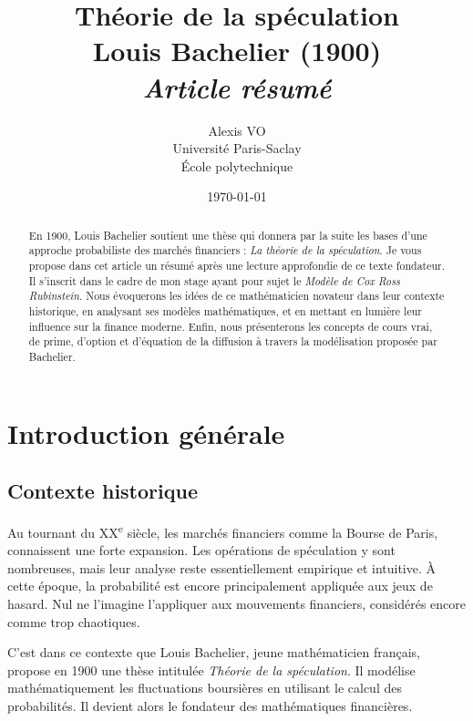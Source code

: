 \documentclass[12pt,a4paper]{article}
\title{\Huge{\textbf{Théorie de la spéculation\\ Louis Bachelier (1900)}}\\ \medskip
      \Huge{\textit{Article résumé}}\vspace*{0.7cm}}
\author{\LARGE{Alexis VO}\vspace{1cm}\\ \medskip
      Université Paris-Saclay\\École polytechnique}
\date{\vspace{0.2cm}\today}
\begin{document}
\vspace{\fill}
  \maketitle
\vspace{\fill}

\newpage

\tableofcontents

\begin{abstract}
En 1900, Louis Bachelier soutient une thèse qui donnera par la suite les bases d’une approche probabiliste des marchés financiers : \textit{La théorie de la spéculation}. Je vous propose dans cet article un résumé après une lecture approfondie de ce texte fondateur. Il s'inscrit dans le cadre de mon stage ayant pour sujet le \textit{Modèle de Cox Ross Rubinstein}. Nous évoquerons les idées de ce mathématicien novateur dans leur contexte historique, en analysant ses modèles mathématiques, et en mettant en lumière leur influence sur la finance moderne. Enfin, nous présenterons les concepts de cours vrai, de prime, d’option et d’équation de la diffusion à travers la modélisation proposée par Bachelier.
\end{abstract}

\newpage

\section{Introduction générale}

\subsection{Contexte historique}

Au tournant du XX\textsuperscript{e} siècle, les marchés financiers comme la Bourse de Paris, connaissent une forte expansion. Les opérations de spéculation y sont nombreuses, mais leur analyse reste essentiellement empirique et intuitive. À cette époque, la probabilité est encore principalement appliquée aux jeux de hasard. Nul ne l'imagine l’appliquer aux mouvements financiers, considérés encore comme trop chaotiques.

C’est dans ce contexte que Louis Bachelier, jeune mathématicien français, propose en 1900 une thèse intitulée \textit{Théorie de la spéculation}. Il modélise mathématiquement les fluctuations boursières en utilisant le calcul des probabilités. Il devient alors le fondateur des mathématiques financières.
\end{document}
